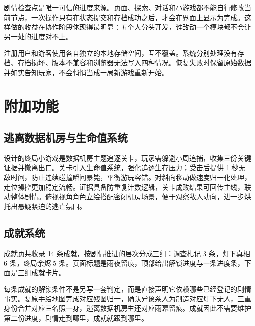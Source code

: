 剧情检查点是唯一可信的进度来源。页面、探索、对话和小游戏都不能自行修改当前节点，一次操作只有在状态提交和存档成功之后，才会在界面上显示为完成。这样做的收益在协作阶段体现得最明显：五个人分头开发，谁改动一个模块都不会让另一处的进度对不上。

注册用户和游客使用各自独立的本地存储空间，互不覆盖。系统分别处理没有存档、存档损坏、版本不兼容和浏览器无法写入四种情况。恢复失败时保留原始数据并如实告知玩家，不会悄悄当成一局新游戏重新开始。

\section{附加功能}

\subsection{逃离数据机房与生命值系统}
设计的终局小游戏是数据机房主题追逐关卡，玩家需躲避小周追捕，收集三份关键证据并撤离出口。关卡引入生命值系统，强化追逐生存压力；受击后提供 1 秒无敌时间，防止连续碰撞瞬间暴毙，平衡游玩容错。对斜向移动做速度归一化处理，走位操控更加稳定流畅。证据具备防重复计数逻辑，关卡成败结果可回传主线，联动整体剧情。俯视视角角色立绘搭配密闭机房场景，便于观察敌人动向，进一步烘托出悬疑紧迫的逃亡氛围。

\subsection{成就系统}

成就页共收录 14 条成就，按剧情推进的层次分成三组：调查札记 3 条，灯下真相 6 条，终局余烬 5 条。页面标题是雨夜留痕，顶部给出解锁进度与一条进度条，下面是三组成就卡片。

每条成就的解锁条件不是另写一套判定，而是直接声明它依赖哪些已经登记的剧情事实。复原手绘地图完成对应残图归一，确认异象系人为制造对应灯下无人，三重身份合并对应三名照一身，逃离数据机房生还对应雨幕留痕。成就因此不需要维护第二份进度，剧情走到哪里，成就就跟到哪里。

